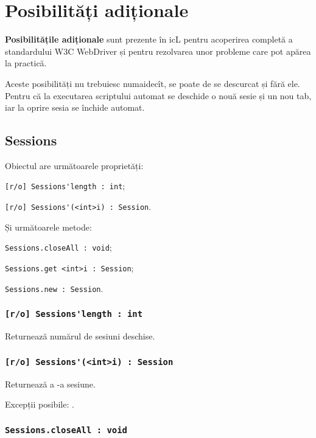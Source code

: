\section{Posibilități adiționale}

{\bf Posibilitățile adiționale} sunt prezente în icL pentru acoperirea completă a standardului W3C WebDriver și pentru rezolvarea unor probleme care pot apărea la practică.

Aceste posibilități nu trebuiesc numaidecît, se poate de se descurcat și fără ele. Pentru că la executarea scriptului automat se deschide o nouă sesie și un nou tab, iar la oprire sesia se închide automat.

\subsection{{\color{orange} Sessions}}

Obiectul \sessions{} are următoarele proprietăți:
\begin{icItems}
	\item \lstinline|[r/o] Sessions'length : int|;
	\item \lstinline|[r/o] Sessions'(<int>i) : Session|.
\end{icItems}

Și următoarele metode:
\begin{icItems}
	\item \lstinline|Sessions.closeAll : void|;
	\item \lstinline|Sessions.get <int>i : Session|;
	\item \lstinline|Sessions.new : Session|.
\end{icItems}

\subsubsection{\lstinline|[r/o] Sessions'length : int|}

Returnează numărul de sesiuni deschise.

\subsubsection{\lstinline|[r/o] Sessions'(<int>i) : Session|}

Returnează a -a sesiune.

Excepții posibile: .

\subsubsection{\lstinline|Sessions.closeAll : void|}


